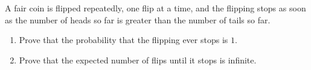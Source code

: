 A fair coin is flipped repeatedly, one flip at a time, and the flipping stops as soon as the number of heads so far is greater than the number of tails so far.
\begin{enumerate}
\item[(a)] Prove that the probability that the flipping ever stops is $1$.
\item[(b)] Prove that the expected number of flips until it stops is infinite.
\end{enumerate}

